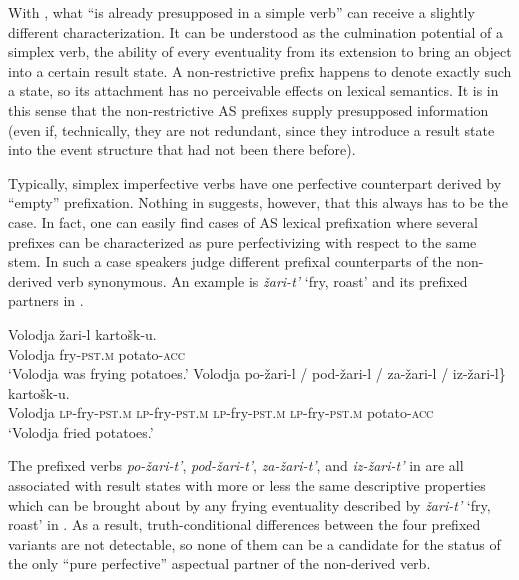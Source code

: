 \documentclass[output=paper,colorlinks,citecolor=brown]{langscibook}
\begin{document}
With , what “is already presupposed in a simple verb” can receive a slightly different characterization. It can be understood as the culmination potential of a simplex verb, the ability of every eventuality from its extension to bring an object into a certain result state. A non-restrictive prefix happens to denote exactly such a state, so its attachment has no perceivable effects on lexical semantics. It is in this sense that the non-restrictive AS prefixes supply presupposed information (even if, technically, they are not redundant, since they introduce a result state into the event structure that had not been there before).

Typically, simplex imperfective verbs have one perfective counterpart derived by “empty” prefixation. Nothing in  suggests, however, that this always has to be the case. In fact, one can easily find cases of AS lexical prefixation where several prefixes can be characterized as pure perfectivizing with respect to the same stem. In such a case speakers judge different prefixal counterparts of the non-derived verb synonymous. An example is \textit{žari-t’} ‘fry, roast’ and its prefixed partners in  \citep{Polivanova1975}.

\ea\label{ex:tatevosov:103}
\ea
\gll   Volodja   žari-l   kartošk-u.  \\
    Volodja   fry-\textsc{pst.m}  potato-\textsc{acc}\\
\glt  ‘Volodja was frying potatoes.’\label{ex:tatevosov:103a}
\ex
\gll   Volodja   \minsp{\{} po-žari-l /  pod-žari-l /  za-žari-l /  iz-žari-l\} kartošk-u.\\
Volodja  {} \textsc{lp}-fry-\textsc{pst.m} {}   \textsc{lp}-fry-\textsc{pst.m} {}   \textsc{lp}-fry-\textsc{pst.m} {}   \textsc{lp}-fry-\textsc{pst.m} potato-\textsc{acc}\\
\glt  ‘Volodja fried potatoes.’\label{ex:tatevosov:103b}
\z
\z

\noindent The prefixed verbs \textit{po-žari-t’}, \textit{pod-žari-t’}, \textit{za-žari-t’}, and \textit{iz-žari-t'} in  are all associated with result states with more or less the same descriptive properties which can be brought about by any frying eventuality described by \textit{žari-t’} ‘fry, roast’ in . As a result, truth-conditional differences between the four prefixed variants are not detectable, so none of them can be a candidate for the status of the only “pure perfective” aspectual partner of the non-derived verb.
\end{document}
